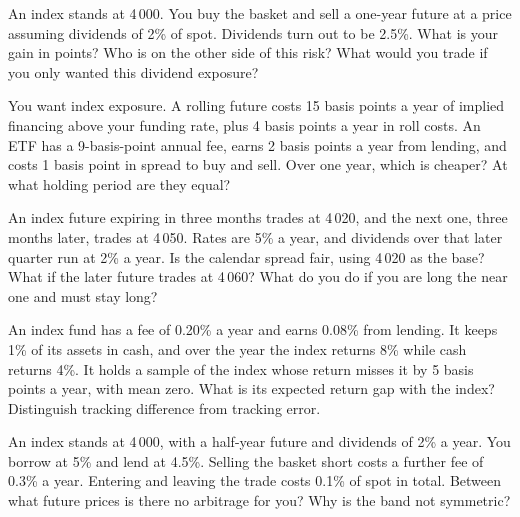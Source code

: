 \begin{question}\label{iq:iv2:etfs-futures-and-index-arbitrage:16}
An index stands at 4\,000. You buy the basket and sell a one-year future at a price assuming dividends of 2\% of spot. Dividends turn out to be 2.5\%. What is your gain in points? Who is on the other side of this risk? What would you trade if you only wanted this dividend exposure?
\end{question}

\begin{question}\label{iq:iv2:etfs-futures-and-index-arbitrage:17}
You want index exposure. A rolling future costs 15 basis points a year of implied financing above your funding rate, plus 4 basis points a year in roll costs. An ETF has a 9-basis-point annual fee, earns 2 basis points a year from lending, and costs 1 basis point in spread to buy and sell. Over one year, which is cheaper? At what holding period are they equal?
\end{question}

\begin{question}\label{iq:iv2:etfs-futures-and-index-arbitrage:18}
An index future expiring in three months trades at 4\,020, and the next one, three months later, trades at 4\,050. Rates are 5\% a year, and dividends over that later quarter run at 2\% a year. Is the calendar spread fair, using 4\,020 as the base? What if the later future trades at 4\,060? What do you do if you are long the near one and must stay long?
\end{question}

\begin{question}\label{iq:iv2:etfs-futures-and-index-arbitrage:19}
An index fund has a fee of 0.20\% a year and earns 0.08\% from lending. It keeps 1\% of its assets in cash, and over the year the index returns 8\% while cash returns 4\%. It holds a sample of the index whose return misses it by 5 basis points a year, with mean zero. What is its expected return gap with the index? Distinguish tracking difference from tracking error.
\end{question}

\begin{question}\label{iq:iv2:etfs-futures-and-index-arbitrage:20}
An index stands at 4\,000, with a half-year future and dividends of 2\% a year. You borrow at 5\% and lend at 4.5\%. Selling the basket short costs a further fee of 0.3\% a year. Entering and leaving the trade costs 0.1\% of spot in total. Between what future prices is there no arbitrage for you? Why is the band not symmetric?
\end{question}

